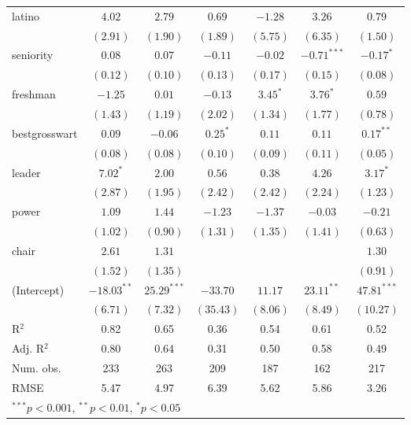 \documentclass[12pt]{article}
\begin{document}
\begin{table}
\begin{center}
\begin{tabular}{l c c c c c c }
			latino                 & $4.02$        & $2.79$        & $0.69$       & $-1.28$      & $3.26$        & $0.79$        \\
			& $(2.91)$      & $(1.90)$      & $(1.89)$     & $(5.75)$     & $(6.35)$      & $(1.50)$      \\
			seniority              & $0.08$        & $0.07$        & $-0.11$      & $-0.02$      & $-0.71^{***}$ & $-0.17^{*}$   \\
			& $(0.12)$      & $(0.10)$      & $(0.13)$     & $(0.17)$     & $(0.15)$      & $(0.08)$      \\
			freshman               & $-1.25$       & $0.01$        & $-0.13$      & $3.45^{*}$   & $3.76^{*}$    & $0.59$        \\
			& $(1.43)$      & $(1.19)$      & $(2.02)$     & $(1.34)$     & $(1.77)$      & $(0.78)$      \\
			bestgrosswart          & $0.09$        & $-0.06$       & $0.25^{*}$   & $0.11$       & $0.11$        & $0.17^{**}$   \\
			& $(0.08)$      & $(0.08)$      & $(0.10)$     & $(0.09)$     & $(0.11)$      & $(0.05)$      \\
			leader                 & $7.02^{*}$    & $2.00$        & $0.56$       & $0.38$       & $4.26$        & $3.17^{*}$    \\
			& $(2.87)$      & $(1.95)$      & $(2.42)$     & $(2.42)$     & $(2.24)$      & $(1.23)$      \\
			power                  & $1.09$        & $1.44$        & $-1.23$      & $-1.37$      & $-0.03$       & $-0.21$       \\
			& $(1.02)$      & $(0.90)$      & $(1.31)$     & $(1.35)$     & $(1.41)$      & $(0.63)$      \\
			chair                  & $2.61$        & $1.31$        &              &              &               & $1.30$        \\
			& $(1.52)$      & $(1.35)$      &              &              &               & $(0.91)$      \\
			(Intercept)            & $-18.03^{**}$ & $25.29^{***}$ & $-33.70$     & $11.17$      & $23.11^{**}$  & $47.81^{***}$ \\
			& $(6.71)$      & $(7.32)$      & $(35.43)$    & $(8.06)$     & $(8.49)$      & $(10.27)$     \\
			\hline
			R$^2$                  & 0.82          & 0.65          & 0.36         & 0.54         & 0.61          & 0.52          \\
			Adj. R$^2$             & 0.80          & 0.64          & 0.31         & 0.50         & 0.58          & 0.49          \\
			Num. obs.              & 233           & 263           & 209          & 187          & 162           & 217           \\
			RMSE                   & 5.47          & 4.97          & 6.39         & 5.62         & 5.86          & 3.26          \\
			\hline
			\multicolumn{7}{l}{\scriptsize{$^{***}p<0.001$, $^{**}p<0.01$, $^*p<0.05$}}
		\end{tabular}
	\end{center}
\end{table}
\end{document}
